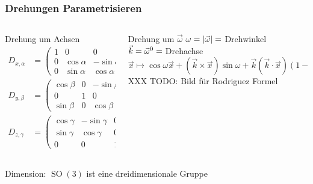 %
%
%
\bgroup
\begin{frame}[t]
\setlength{\abovedisplayskip}{5pt}
\setlength{\belowdisplayskip}{5pt}
\frametitle{Drehungen Parametrisieren}
\vspace{-20pt}
\begin{columns}[t,onlytextwidth]
\begin{column}{0.4\textwidth}
\begin{block}{Drehung um Achsen}
\begin{align*}
D_{x,\alpha}
&=
\begin{pmatrix}
1&0&0\\0&\cos\alpha&-\sin\alpha\\0&\sin\alpha&\cos\alpha
\end{pmatrix}
\\
D_{y,\beta}
&=
\begin{pmatrix}
\cos\beta&0&-\sin\beta\\0&1&0\\\sin\beta&0&\cos\beta
\end{pmatrix}
\\
D_{z,\gamma}
&=
\begin{pmatrix}
\cos\gamma&-\sin\gamma&0\\\sin\gamma&\cos\gamma&0\\0&0&1
\end{pmatrix}
\end{align*}
\end{block}
\end{column}
\begin{column}{0.56\textwidth}
\begin{block}{Drehung um $\vec{\omega}$}
$\omega=|\vec{\omega}|=\mathstrut$Drehwinkel
\\
$\vec{k}=\vec{\omega}^0=\mathstrut$Drehachse
\[
\vec{x}
\mapsto
\cos\omega
\vec{x}
+
(\vec{k}\times\vec{x})\sin\omega
+
\vec{k}(\vec{k}\cdot\vec{x}) (1-\cos\omega)
\]
XXX TODO: Bild für Rodriguez Formel
\end{block}
\end{column}
\end{columns}
{Dimension:} $\operatorname{SO}(3)$ ist eine
dreidimensionale Gruppe
\end{frame}
\egroup
